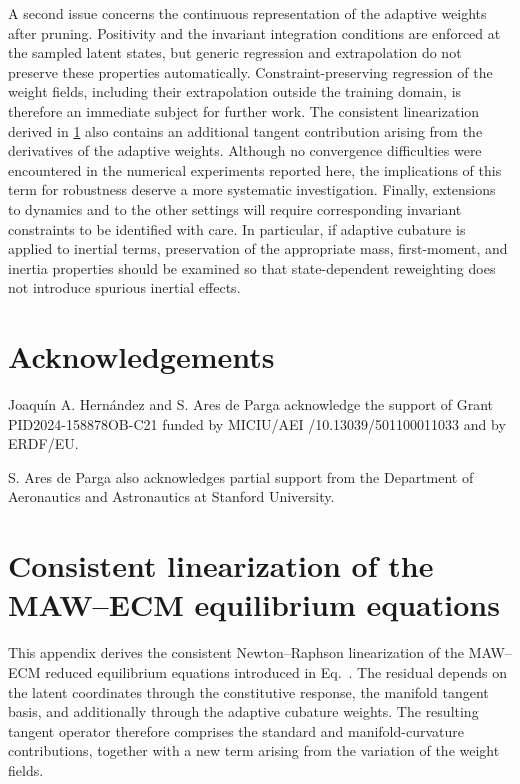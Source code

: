 \documentclass[preprint,10pt]{elsarticle}  %
\begin{document}
A second issue concerns the continuous representation of the adaptive
weights after pruning. Positivity and the invariant integration conditions are enforced at the
sampled latent states, but generic regression and extrapolation do not
preserve these properties automatically. Constraint-preserving
regression of the weight fields, including their extrapolation outside
the training domain, is therefore an immediate subject for further
work. The consistent linearization derived in
\ref{app:MAW_linearization} also contains an additional tangent
contribution arising from the derivatives of the adaptive weights.
Although no convergence difficulties were encountered in the numerical
experiments reported here, the implications of this term for  robustness deserve a more
systematic investigation. Finally, extensions to dynamics and to the
other settings  will require corresponding
invariant constraints to be identified with care. In particular, if adaptive cubature is applied to inertial terms,
preservation of the appropriate mass, first-moment, and inertia
properties should be examined so that state-dependent reweighting does
not introduce spurious inertial effects.


\section*{Acknowledgements}

Joaquín A. Hernández and S. Ares de Parga acknowledge  the support of Grant PID2024-158878OB-C21 funded by MICIU/AEI /10.13039/501100011033 and by ERDF/EU.

S. Ares de Parga also acknowledges partial support from the Department of Aeronautics and Astronautics at Stanford University.


\appendix
 \section{Consistent linearization of the MAW--ECM equilibrium equations}
\label{app:MAW_linearization}
%


This appendix derives the consistent Newton--Raphson linearization of
the MAW--ECM reduced equilibrium equations introduced in
Eq.~. The residual depends on the latent
coordinates through the constitutive response, the manifold tangent
basis,  and additionally
through the adaptive cubature weights. The resulting tangent operator
therefore comprises the standard and manifold-curvature contributions,
together with a new term arising from the variation of the weight
fields.
\end{document}
